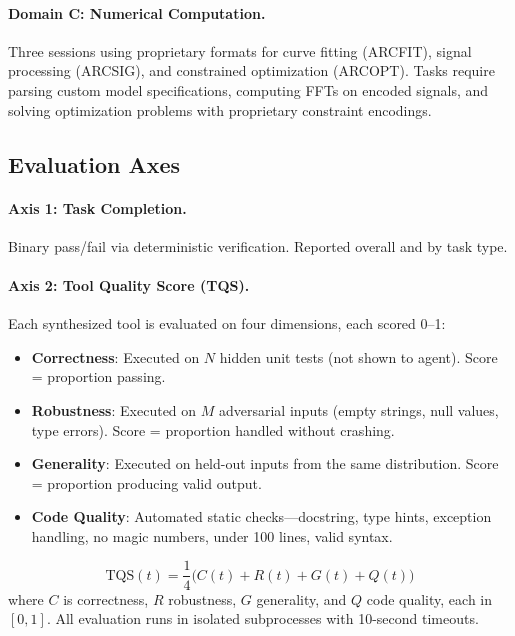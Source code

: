 \documentclass[]{ceurart}
\begin{document}
\paragraph{Domain C: Numerical Computation.} Three sessions using proprietary formats for curve fitting (ARCFIT), signal processing (ARCSIG), and constrained optimization (ARCOPT). Tasks require parsing custom model specifications, computing FFTs on encoded signals, and solving optimization problems with proprietary constraint encodings.

\subsection{Evaluation Axes}

\paragraph{Axis 1: Task Completion.} Binary pass/fail via deterministic verification. Reported overall and by task type.

\paragraph{Axis 2: Tool Quality Score (TQS).} Each synthesized tool is evaluated on four dimensions, each scored 0--1:

\begin{itemize}
\item \textbf{Correctness}: Executed on $N$ hidden unit tests (not shown to agent). Score = proportion passing.
\item \textbf{Robustness}: Executed on $M$ adversarial inputs (empty strings, null values, type errors). Score = proportion handled without crashing.
\item \textbf{Generality}: Executed on held-out inputs from the same distribution. Score = proportion producing valid output.
\item \textbf{Code Quality}: Automated static checks---docstring, type hints, exception handling, no magic numbers, under 100 lines, valid syntax.
\end{itemize}

\begin{equation}
\text{TQS}(t) = \frac{1}{4}\bigl(C(t) + R(t) + G(t) + Q(t)\bigr)
\label{eq:tqs}
\end{equation}
where $C$ is correctness, $R$ robustness, $G$ generality, and $Q$ code quality, each in $[0,1]$. All evaluation runs in isolated subprocesses with 10-second timeouts.
\end{document}
